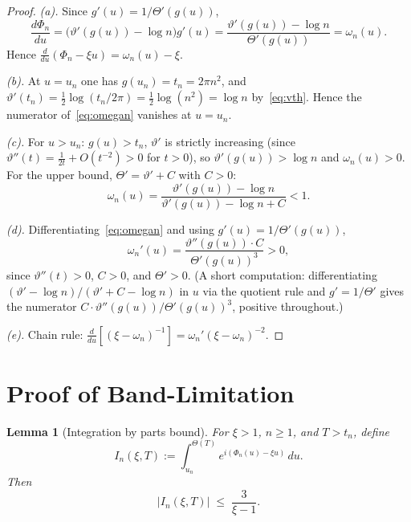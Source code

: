 \documentclass[12pt]{amsart}
\newtheorem{lemma}[theorem]{Lemma}
\theoremstyle{definition}
\theoremstyle{remark}
\newcommand{\Th}{\Theta}
\newcommand{\vth}{\vartheta}
\begin{document}
\begin{proof}
\textit{(a).} Since $g'(u)=1/\Th'(g(u))$,
\begin{equation}\label{eq:dPhi}
  \frac{d\Phi_n}{du}
  = \bigl(\vth'(g(u))-\log n\bigr)g'(u)
  = \frac{\vth'(g(u))-\log n}{\Th'(g(u))} = \omega_n(u).
\end{equation}
Hence $\frac{d}{du}(\Phi_n-\xi u)=\omega_n(u)-\xi$.

\textit{(b).} At $u=u_n$ one has $g(u_n)=t_n=2\pi n^2$, and
$\vth'(t_n)=\tfrac{1}{2}\log(t_n/2\pi)=\tfrac{1}{2}\log(n^2)=\log n$
by~\eqref{eq:vth}.  Hence the numerator of~\eqref{eq:omegan} vanishes
at $u=u_n$.

\textit{(c).} For $u>u_n$: $g(u)>t_n$, $\vth'$ is strictly increasing
(since $\vth''(t)=\frac{1}{2t}+O(t^{-2})>0$ for $t>0$), so
$\vth'(g(u))>\log n$ and $\omega_n(u)>0$.
For the upper bound, $\Th'=\vth'+C$ with $C>0$:
\begin{equation}\label{eq:omegaub}
  \omega_n(u)
  = \frac{\vth'(g(u))-\log n}{\vth'(g(u))-\log n + C}
  < 1.
\end{equation}

\textit{(d).} Differentiating~\eqref{eq:omegan} and using
$g'(u)=1/\Th'(g(u))$,
\begin{equation}\label{eq:omegaprime}
  \omega_n'(u)
  = \frac{\vth''(g(u))\cdot C}{\Th'(g(u))^3} > 0,
\end{equation}
since $\vth''(t)>0$, $C>0$, and $\Th'>0$.
(A short computation: differentiating $(\vth'-\log n)/(\vth'+C-\log n)$
in $u$ via the quotient rule and $g'=1/\Th'$ gives the numerator
$C\cdot\vth''(g(u))/\Th'(g(u))^3$, positive throughout.)

\textit{(e).} Chain rule: $\frac{d}{du}[(\xi-\omega_n)^{-1}]
=\omega_n'(\xi-\omega_n)^{-2}$.
\end{proof}

\section{Proof of Band-Limitation}\label{sec:main}

\begin{lemma}[Integration by parts bound]\label{lem:ibp}
For $\xi>1$, $n\ge 1$, and $T>t_n$, define
\begin{equation}\label{eq:In}
  I_n(\xi,T) := \int_{u_n}^{\Th(T)} e^{i(\Phi_n(u)-\xi u)}\,du.
\end{equation}
Then
\begin{equation}\label{eq:Inbound}
  |I_n(\xi,T)| \;\le\; \frac{3}{\xi-1}.
\end{equation}
\end{lemma}
\end{document}
